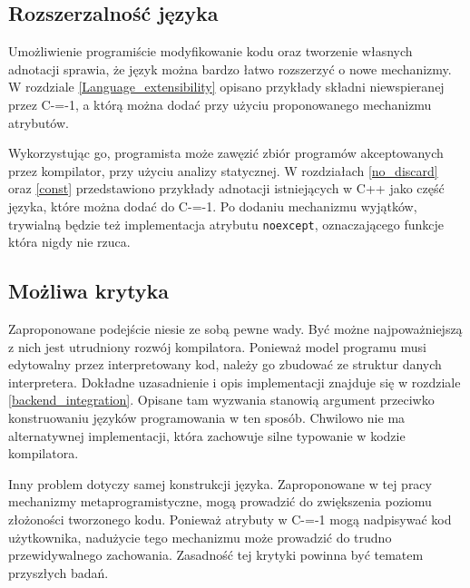 \subsection{Rozszerzalność języka}

Umożliwienie programiście modyfikowanie kodu oraz tworzenie własnych adnotacji sprawia, że język można bardzo łatwo rozszerzyć o nowe mechanizmy.
W rozdziale \ref{Language_extensibility} opisano przykłady składni niewspieranej przez C-=-1, a którą można dodać przy użyciu proponowanego mechanizmu atrybutów.

Wykorzystując go, programista może zawęzić zbiór programów akceptowanych przez kompilator, przy użyciu analizy statycznej.
W rozdziałach \ref{no_discard} oraz \ref{const} przedstawiono przykłady adnotacji istniejących w C++ jako część języka, które można dodać do C-=-1.
Po dodaniu mechanizmu wyjątków, trywialną będzie też implementacja atrybutu \lstinline{noexcept}, oznaczającego funkcje która nigdy nie rzuca.

\subsection{Możliwa krytyka}

Zaproponowane podejście niesie ze sobą pewne wady.
Być możne najpoważniejszą z nich jest utrudniony rozwój kompilatora.
Ponieważ model programu musi edytowalny przez interpretowany kod, należy go zbudować ze struktur danych interpretera.
Dokładne uzasadnienie i opis implementacji znajduje się w rozdziale \ref{backend_integration}.
Opisane tam wyzwania stanowią argument przeciwko konstruowaniu języków programowania w ten sposób. 
Chwilowo nie ma alternatywnej implementacji, która zachowuje silne typowanie w kodzie kompilatora.

Inny problem dotyczy samej konstrukcji języka.
Zaproponowane w tej pracy mechanizmy metaprogramistyczne, mogą prowadzić do zwiększenia poziomu złożoności tworzonego kodu.
Ponieważ atrybuty w C-=-1 mogą nadpisywać kod użytkownika, nadużycie tego mechanizmu może prowadzić do trudno przewidywalnego zachowania.
Zasadność tej krytyki powinna być tematem przyszłych badań.

